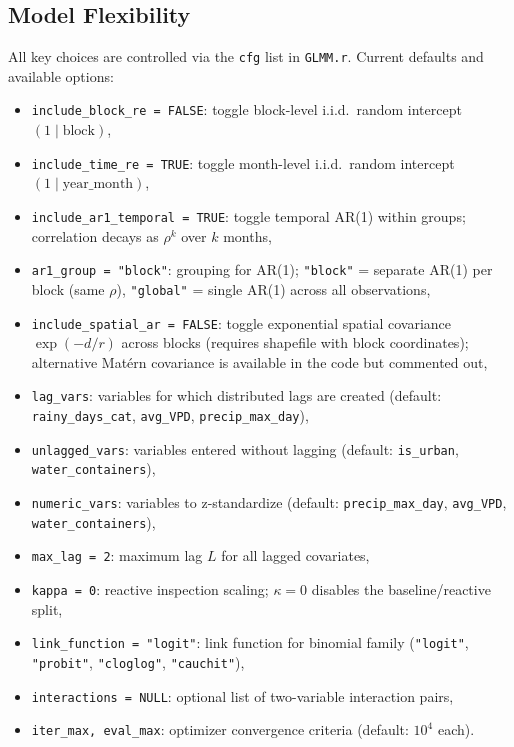 \documentclass[12pt,a4paper]{article}
\begin{document}
\subsection{Model Flexibility}

All key choices are controlled via the \texttt{cfg} list in \texttt{GLMM.r}.
Current defaults and available options:
\begin{itemize}
\item \texttt{include\_block\_re = FALSE}: toggle block-level i.i.d.\ random intercept $(1 \mid \text{block})$,
\item \texttt{include\_time\_re = TRUE}: toggle month-level i.i.d.\ random intercept $(1 \mid \text{year\_month})$,
\item \texttt{include\_ar1\_temporal = TRUE}: toggle temporal AR(1) within groups; correlation decays as $\rho^k$ over $k$ months,
\item \texttt{ar1\_group = "block"}: grouping for AR(1); \texttt{"block"} = separate AR(1) per block (same $\rho$), \texttt{"global"} = single AR(1) across all observations,
\item \texttt{include\_spatial\_ar = FALSE}: toggle exponential spatial covariance $\exp(-d/r)$ across blocks (requires shapefile with block coordinates); alternative Mat\'{e}rn covariance is available in the code but commented out,
\item \texttt{lag\_vars}: variables for which distributed lags are created (default: \texttt{rainy\_days\_cat}, \texttt{avg\_VPD}, \texttt{precip\_max\_day}),
\item \texttt{unlagged\_vars}: variables entered without lagging (default: \texttt{is\_urban}, \texttt{water\_containers}),
\item \texttt{numeric\_vars}: variables to z-standardize (default: \texttt{precip\_max\_day}, \texttt{avg\_VPD}, \texttt{water\_containers}),
\item \texttt{max\_lag = 2}: maximum lag $L$ for all lagged covariates,
\item \texttt{kappa = 0}: reactive inspection scaling; $\kappa = 0$ disables the baseline/reactive split,
\item \texttt{link\_function = "logit"}: link function for binomial family (\texttt{"logit"}, \texttt{"probit"}, \texttt{"cloglog"}, \texttt{"cauchit"}),
\item \texttt{interactions = NULL}: optional list of two-variable interaction pairs,
\item \texttt{iter\_max, eval\_max}: optimizer convergence criteria (default: $10^4$ each).
\end{itemize}
\end{document}
